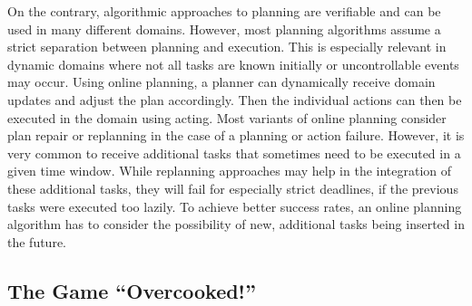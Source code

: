 On the contrary, algorithmic approaches to planning are verifiable and can be used in many different domains.
However, most planning algorithms assume a strict separation between planning and execution.
This is especially relevant in dynamic domains where not all tasks are known initially or uncontrollable events may occur.
Using online planning, a planner can dynamically receive domain updates and adjust the plan accordingly.
Then the individual actions can then be executed in the domain using acting.
Most variants of online planning consider plan repair or replanning in the case of a planning or action failure.
However, it is very common to receive additional tasks that sometimes need to be executed in a given time window.
While replanning approaches may help in the integration of these additional tasks, they will fail for especially strict deadlines, if the previous tasks were executed too lazily.
To achieve better success rates, an online planning algorithm has to consider the possibility of new, additional tasks being inserted in the future.


\subsection{The Game ``Overcooked!''}\label{sec:introduction-domain}

